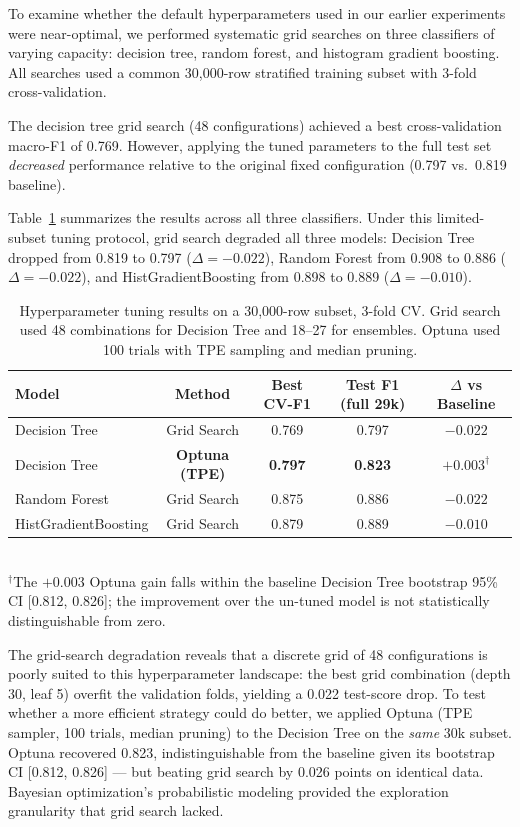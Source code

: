 \documentclass{article}
\begin{document}
To examine whether the default hyperparameters used in our earlier experiments were near-optimal, we performed systematic grid searches on three classifiers of varying capacity: decision tree, random forest, and histogram gradient boosting.  All searches used a common 30,000-row stratified training subset with 3-fold cross-validation.

The decision tree grid search (48 configurations) achieved a best cross-validation macro-F1 of 0.769.  However, applying the tuned parameters to the full test set \emph{decreased} performance relative to the original fixed configuration (0.797 vs.\ 0.819 baseline).

Table~\ref{tab:tuning} summarizes the results across all three classifiers.  Under this limited-subset tuning protocol, grid search degraded all three models: Decision Tree dropped from 0.819 to 0.797 ($\Delta = -0.022$), Random Forest from 0.908 to 0.886 ($\Delta = -0.022$), and HistGradientBoosting from 0.898 to 0.889 ($\Delta = -0.010$).

\begin{table}[H]
  \centering
  \caption{Hyperparameter tuning results on a 30,000-row subset, 3-fold CV.  Grid search used 48 combinations for Decision Tree and 18--27 for ensembles.  Optuna used 100 trials with TPE sampling and median pruning.}
  \label{tab:tuning}
  \small
  \begin{tabular}{lcccc}
    \toprule
    Model & Method & Best CV-F1 & Test F1 (full 29k) & $\Delta$ vs Baseline \\
    \midrule
    Decision Tree & Grid Search & 0.769 & 0.797 & $-0.022$ \\
    Decision Tree & \textbf{Optuna (TPE)} & \textbf{0.797} & \textbf{0.823} & $+0.003^{\dagger}$ \\
    Random Forest & Grid Search & 0.875 & 0.886 & $-0.022$ \\
    HistGradientBoosting & Grid Search & 0.879 & 0.889 & $-0.010$ \\
    \bottomrule
  \end{tabular}
  \vspace{0.3\baselineskip}
  \\
  {\footnotesize $^{\dagger}$The $+0.003$ Optuna gain falls within the baseline Decision Tree bootstrap 95\% CI [0.812, 0.826]; the improvement over the un-tuned model is not statistically distinguishable from zero.}
\end{table}

The grid-search degradation reveals that a discrete grid of 48 configurations is poorly suited to this hyperparameter landscape: the best grid combination (depth 30, leaf 5) overfit the validation folds, yielding a 0.022 test-score drop.  To test whether a more efficient strategy could do better, we applied Optuna \cite{optuna} (TPE sampler, 100 trials, median pruning) to the Decision Tree on the \emph{same} 30k subset.  Optuna recovered 0.823, indistinguishable from the baseline given its bootstrap CI [0.812, 0.826] — but beating grid search by 0.026 points on identical data.  Bayesian optimization's probabilistic modeling provided the exploration granularity that grid search lacked.
\end{document}
